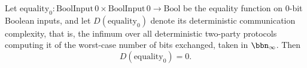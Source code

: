 \begin{theorem}[Deterministic complexity of equality at $n = 0$]
\label{CommunicationComplexity.Functions.Equality.communicationComplexity_zero}
\leanok
{}
Let $\mathrm{equality}_0 \colon \mathrm{BoolInput}\,0 \times \mathrm{BoolInput}\,0 \to
\mathrm{Bool}$ be the equality function on $0$-bit Boolean inputs, and let
$D(\mathrm{equality}_0)$ denote its deterministic communication complexity, that is, the
infimum over all deterministic two-party protocols computing it of the worst-case number
of bits exchanged, taken in $\bbn_\infty$. Then
\[
  D(\mathrm{equality}_0) = 0.
\]
\end{theorem}

